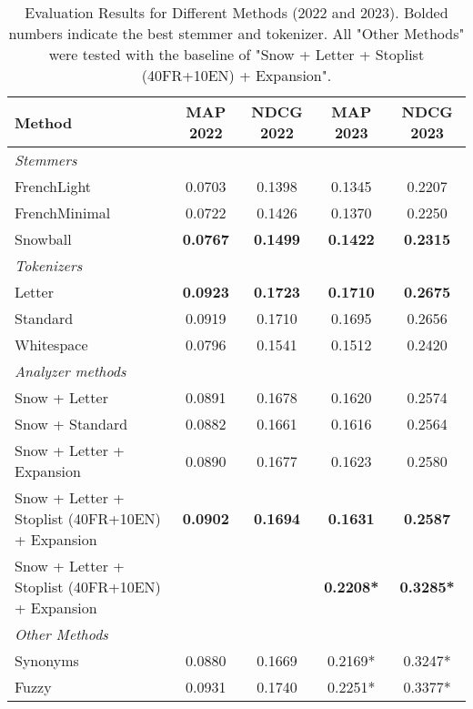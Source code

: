 \begin{table}[htbp]
\centering
\caption{Evaluation Results for Different Methods (2022 and 2023). Bolded numbers indicate the best stemmer and tokenizer. All "Other Methods" were tested with the baseline of "Snow + Letter + Stoplist (40FR+10EN) + Expansion".}
\label{tab:evaluation_results}
\small
\begin{tabular}{|l|c|c|c|c|}
\hline
\rowcolor{gray!20}
\textbf{Method} & \textbf{MAP 2022} & \textbf{NDCG 2022} & \textbf{MAP 2023} & \textbf{NDCG 2023} \\
\hline
\multicolumn{5}{|l|}{\footnotesize\textit{Stemmers}} \\
FrenchLight                    & 0.0703 & 0.1398 & 0.1345 & 0.2207 \\
FrenchMinimal                  & 0.0722 & 0.1426 & 0.1370 & 0.2250 \\
Snowball                       & \textbf{0.0767} & \textbf{0.1499} & \textbf{0.1422} & \textbf{0.2315} \\
\hline
\multicolumn{5}{|l|}{\footnotesize\textit{Tokenizers}} \\
Letter                         & \textbf{0.0923} & \textbf{0.1723} & \textbf{0.1710} & \textbf{0.2675} \\
Standard                       & 0.0919 & 0.1710 & 0.1695 & 0.2656 \\
Whitespace                     & 0.0796 & 0.1541 & 0.1512 & 0.2420 \\
\hline
\multicolumn{5}{|l|}{\footnotesize\textit{Analyzer methods}} \\
Snow + Letter                           & 0.0891 & 0.1678 & 0.1620 & 0.2574 \\
Snow + Standard                         & 0.0882 & 0.1661 & 0.1616 & 0.2564 \\
Snow + Letter + Expansion               & 0.0890 & 0.1677 & 0.1623 & 0.2580 \\
Snow + Letter + Stoplist (40FR+10EN) + Expansion & \textbf{0.0902} & \textbf{0.1694} & \textbf{0.1631} & \textbf{0.2587} \\
Snow + Letter + Stoplist (40FR+10EN) + Expansion &  &  & \textbf{0.2208*} & \textbf{0.3285*} \\
\hline
\multicolumn{5}{|l|}{\footnotesize\textit{Other Methods}} \\
Synonyms                                            & 0.0880 & 0.1669 & 0.2169*& 0.3247*\\
Fuzzy                                               & 0.0931 & 0.1740 & 0.2251*& 0.3377*\\

\end{tabular}
\end{table}
